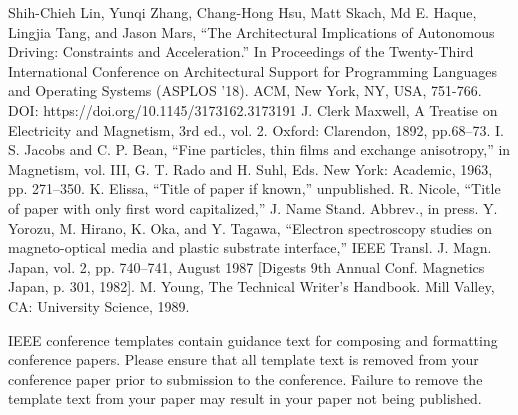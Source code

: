 \documentclass[conference]{IEEEtran}
\begin{document}
\begin{thebibliography}{00}
 Shih-Chieh Lin, Yunqi Zhang, Chang-Hong Hsu, Matt Skach, Md E. Haque, Lingjia Tang, and Jason Mars, ``The Architectural Implications of Autonomous Driving: Constraints and Acceleration.'' In Proceedings of the Twenty-Third International Conference on Architectural Support for Programming Languages and Operating Systems (ASPLOS '18). ACM, New York, NY, USA, 751-766. DOI: https://doi.org/10.1145/3173162.3173191
 J. Clerk Maxwell, A Treatise on Electricity and Magnetism, 3rd ed., vol. 2. Oxford: Clarendon, 1892, pp.68--73.
 I. S. Jacobs and C. P. Bean, ``Fine particles, thin films and exchange anisotropy,'' in Magnetism, vol. III, G. T. Rado and H. Suhl, Eds. New York: Academic, 1963, pp. 271--350.
 K. Elissa, ``Title of paper if known,'' unpublished.
 R. Nicole, ``Title of paper with only first word capitalized,'' J. Name Stand. Abbrev., in press.
 Y. Yorozu, M. Hirano, K. Oka, and Y. Tagawa, ``Electron spectroscopy studies on magneto-optical media and plastic substrate interface,'' IEEE Transl. J. Magn. Japan, vol. 2, pp. 740--741, August 1987 [Digests 9th Annual Conf. Magnetics Japan, p. 301, 1982].
 M. Young, The Technical Writer's Handbook. Mill Valley, CA: University Science, 1989.
\end{thebibliography}
\vspace{12pt}
\color{red}
IEEE conference templates contain guidance text for composing and formatting conference papers. Please ensure that all template text is removed from your conference paper prior to submission to the conference. Failure to remove the template text from your paper may result in your paper not being published.
\end{document}
